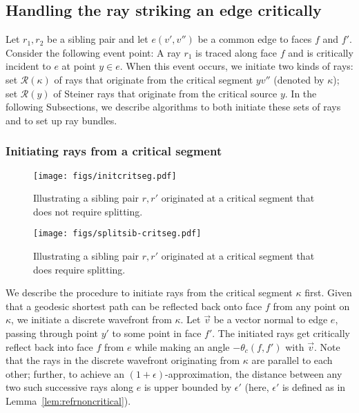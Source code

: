\documentclass[11pt]{article}
\def\calR{\mathcal{R}}
\begin{document}
\subsection{Handling the ray striking an edge critically}
\label{subsect:crit}

Let $r_1, r_2$ be a sibling pair and let $e(v', v'')$ be a common edge to faces $f$ and $f'$.
Consider the following event point: A ray $r_1$ is traced along face $f$ and is critically incident to $e$ at point $y \in e$.
When this event occurs, we initiate two kinds of rays:
set $\calR(\kappa)$ of rays that originate from the critical segment $yv''$ (denoted by $\kappa$);
set $\calR(y)$ of Steiner rays that originate from the critical source $y$. 
In the following Subsections, we describe algorithms to both initiate these sets of rays and to set up ray bundles. 

\subsubsection{Initiating rays from a critical segment}
\label{subsect:initrayscritseg}

\begin{figure}[h]
\begin{minipage}[t]{0.49\linewidth}
\begin{center}
\texttt{[image: figs/initcritseg.pdf]}
\caption{\footnotesize Illustrating a sibling pair $r, r'$ originated at a critical segment that does not require splitting.} 
\label{fig:initcritseg}
\end{center}
\end{minipage}
\hspace*{0.04in}
\begin{minipage}[t]{0.49\linewidth}
\begin{center}
\texttt{[image: figs/splitsib-critseg.pdf]}
\caption{\footnotesize Illustrating a sibling pair $r, r'$ originated at a critical segment that does require splitting.} 
\label{fig:splitsib-critseg}
\end{center}
\end{minipage}
\vspace*{-0.1in}
\end{figure}

We describe the procedure to initiate rays from the critical segment $\kappa$ first.
Given that a geodesic shortest path can be reflected back onto face $f$ from any point on $\kappa$, we initiate a discrete wavefront from $\kappa$.
Let $\overrightarrow{v}$ be a vector normal to edge $e$, passing through point $y'$ to some point in face $f'$.
The initiated rays get critically reflect back into face $f$ from $e$ while making an angle $-\theta_c(f, f')$ with $\overrightarrow{v}$.  
Note that the rays in the discrete wavefront originating from $\kappa$ are parallel to each other; further, to achieve an $(1+\epsilon)$-approximation, the distance between any two such successive rays along $e$ is upper bounded by $\epsilon'$ (here, $\epsilon'$ is defined as in Lemma~\ref{lem:refrnoncritical}).
\end{document}
